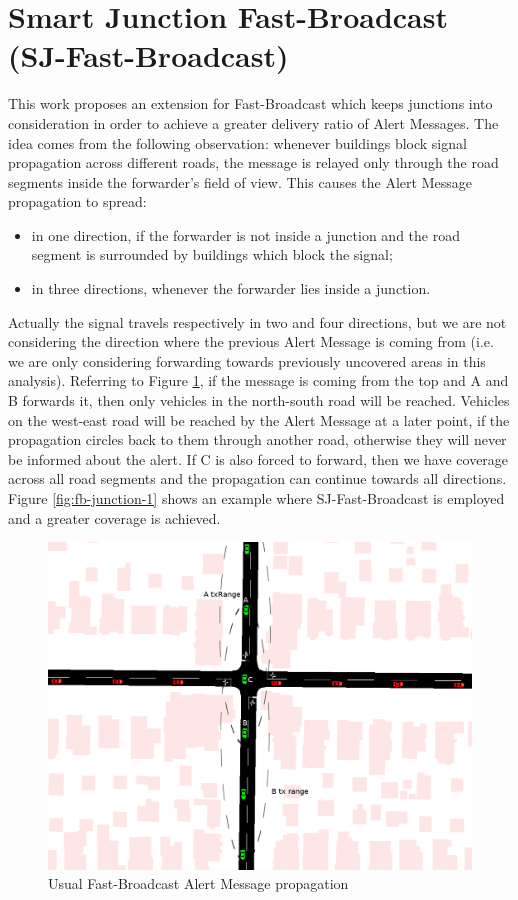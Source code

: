 	\section{Smart Junction Fast-Broadcast (SJ-Fast-Broadcast)}
		\label{sj:fb}
		This work proposes an extension for Fast-Broadcast which keeps junctions into consideration in order to achieve a greater delivery ratio of Alert Messages. The idea comes from the following observation: whenever buildings block signal propagation across different roads, the message is relayed only through the road segments inside the forwarder's field of view. This causes the Alert Message propagation to spread:
		\begin{itemize}
			\item in one direction, if the forwarder is not inside a junction and the road segment is surrounded by buildings which block the signal;
			\item in three directions, whenever the forwarder lies inside a junction. 
		\end{itemize}
		Actually the signal travels respectively in two and four directions, but we are not considering the direction where the previous Alert Message is coming from (i.e. we are only considering forwarding towards previously uncovered areas in this analysis).
		Referring to Figure \ref{fig:fb-junction-0}, if the message is coming from the top and A and B forwards it, then only vehicles in the north-south road will be reached. Vehicles on the west-east road will be reached by the Alert Message at a later point, if the propagation circles back to them through another road, otherwise they will never be informed about the alert. If C is also forced to forward, then we have coverage across all road segments and the propagation can continue towards all directions. Figure \ref{fig:fb-junction-1} shows an example where SJ-Fast-Broadcast is employed and a greater coverage is achieved.
		
		\begin{figure}[H]
			\centering
			\includegraphics[width=\textwidth]{immagini/fb-junction-0}
			\caption{Usual Fast-Broadcast Alert Message propagation}
			\label{fig:fb-junction-0}
		\end{figure}
	
